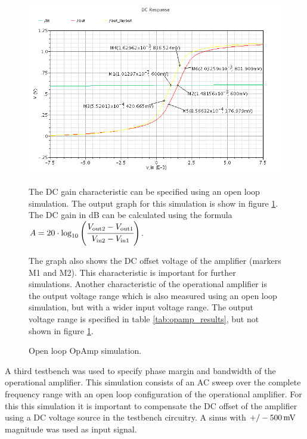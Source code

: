 \documentclass[parskip,oneside,colorbacktitle,10pt,accentcolor=tud1b]{tudreport}
\begin{document}
{\begin{figure}[H]
	\begin{minipage}[t]{0.55\textwidth} 
		\begin{center}
		    \includegraphics[scale=0.4]{opamp_openloop_detail}
		    \caption{Open loop OpAmp simulation.}
		    \label{fig:opamp_openloop_detail}	
		\end{center}
	\end{minipage}
	\begin{minipage}[t]{0.4\textwidth} 
	\setlength{\parskip}{\currentparskip} %
	\vspace{.8cm}
The DC gain characteristic can be specified using an open loop simulation. The output graph for this simulation is show in figure \ref{fig:opamp_openloop_detail}. 
The DC gain in dB can be calculated using the formula $A = 20 \cdot \log_{10} \left( \cfrac{V_\text{out2}-V_\text{out1}}{V_\text{in2}-V_\text{in1}} \right)$. 

The graph also shows the DC offset voltage of the amplifier (markers M1 and M2). This characteristic is important for further simulations.
 Another characteristic of the operational amplifier is the output voltage range which is also measured using an open loop simulation, but with a wider input voltage range. The output voltage range is specified in table \ref{tab:opamp_results}, but not shown in figure \ref{fig:opamp_openloop_detail}.
	\end{minipage}
\end{figure}

A third testbench was used to specify phase margin and bandwidth of the operational amplifier. This simulation consists of an AC sweep over the complete frequency range with an open loop configuration of the operational amplifier. For this this simulation it is important to compensate the DC offset of the amplifier using a DC voltage source in the testbench circuitry. A sinus with $\unit[+/-500]{mV}$ magnitude was used as input signal.

}
\end{document}
